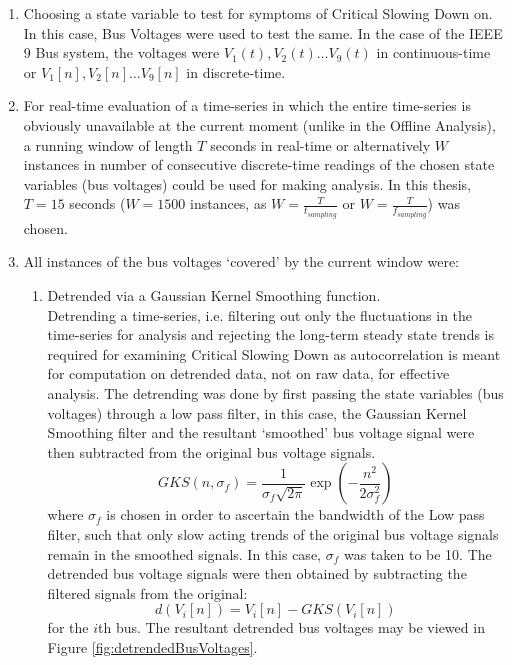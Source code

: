\begin{enumerate}
	\item Choosing a state variable to test for symptoms of Critical Slowing Down on. In this case, Bus Voltages were used to test the same. In the case of the IEEE 9 Bus system, the voltages were $V_1(t), V_2(t) \ldots V_9(t)$ in continuous-time or $V_1[n], V_2[n] \ldots V_9[n]$ in discrete-time.
	\item For real-time evaluation of a time-series in which the entire time-series is obviously unavailable at the current moment (unlike in the Offline Analysis), a running window of length $T$ seconds in real-time or alternatively $W$ instances in number of consecutive discrete-time readings of the chosen state variables (bus voltages) could be used for making analysis. In this thesis, $T=15$ seconds ($W=1500$ instances, as $W=\frac{T}{t_{sampling}}$ or $W=\frac{T}{f_{sampling}}$) was chosen.
	\item All instances of the bus voltages `covered' by the current window were:\\
		\begin{enumerate}
			\item Detrended via a Gaussian Kernel Smoothing function. \\
			Detrending a time-series, i.e. filtering out only the fluctuations in the time-series for analysis and rejecting the long-term steady state trends is required for examining Critical Slowing Down as autocorrelation is meant for computation on detrended data, not on raw data, for effective analysis. The detrending was done by first passing the state variables (bus voltages) through a low pass filter, in this case, the Gaussian Kernel Smoothing filter and the resultant `smoothed' bus voltage signal were then subtracted from the original bus voltage signals.
			\begin{equation}
				GKS(n, \sigma_f) = \frac{1}{\sigma_f \sqrt{2\pi}}\exp{\left(-\frac{n^2}{2\sigma_f^2}\right)}
			\end{equation}
			where $\sigma_f$ is chosen in order to ascertain the bandwidth of the Low pass filter, such that only slow acting trends of the original bus voltage signals remain in the smoothed signals. In this case, $\sigma_f$ was taken to be 10.
			The detrended bus voltage signals were then obtained by subtracting the filtered signals from the original:
			\begin{equation}
				d(V_i[n]) = V_i[n] - GKS(V_i[n])
			\end{equation}
			\hspace{25pt} for the $i$th bus.
			The resultant detrended bus voltages may be viewed in Figure \ref{fig:detrendedBusVoltages}. 
			

\end{enumerate}
\end{enumerate}
